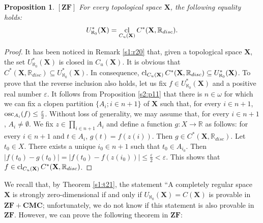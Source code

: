 \documentclass[12pt,twoside,leqno]{article}
\theoremstyle{plain}
\newtheorem{proposition}[theorem]{Proposition}
\theoremstyle{definition}
\theoremstyle{remark}
\DeclareMathOperator{\cl}{{\rm cl}}
\DeclareMathOperator{\osc}{{\rm osc}}
\begin{document}
\begin{proposition}
	\label{s2:p12}
	$[\mathbf{ZF}]$  For every topological space $\mathbf{X}$, the following equality holds:
	$$U_{\aleph_0}^{\ast}(\mathbf{X})=\cl_{C_u(\mathbf{X})}C^{\ast}(\mathbf{X}, \mathbb{R}_{disc}).$$
\end{proposition}
\begin{proof}
	It has been noticed in Remark \ref{s1:r20} that, given a topological space $\mathbf{X}$, the set $U_{\aleph_0}^{\ast}(\mathbf{X})$ is closed in $C_u(\mathbf{X})$. It is obvious that $C^{\ast}(\mathbf{X}, \mathbb{R}_{disc})\subseteq U_{\aleph_0}^{\ast}(\mathbf{X})$. In consequence, $\cl_{C_u(\mathbf{X})}C^{\ast}(\mathbf{X}, \mathbb{R}_{disc})\subseteq U_{\aleph_0}^{\ast}(\mathbf{X})$. To prove that the reverse inclusion also holds, let us fix $f\in U_{\aleph_0}^{\ast}(\mathbf{X})$ and a positive real number $\varepsilon$. It follows from Proposition \ref{s2:p11} that there is  $n\in\omega$ for which we can fix a clopen partition $\{A_i; i\in n+1\}$ of $\mathbf{X}$ such that, for every $i\in n+1$, $\osc_{A_i}(f)\leq\frac{\varepsilon}{2}$. Without loss of generality, we may assume that, for every $i\in n+1$, $A_i\neq\emptyset$. We fix $z\in\prod\limits_{i\in n+1}A_i$ and define a function $g:X\to\mathbb{R}$ as follows: for every $i\in n+1$ and $t\in A_i$, $g(t)=f(z(i))$. Then $g\in C^{\ast}(\mathbf{X}, \mathbb{R}_{disc})$. Let $t_0\in X$. There exists a unique $i_0\in n+1$ such that $t_0\in A_{i_0}$. Then $|f(t_0)-g(t_0)|=|f(t_0)-f(z(i_0))|\leq\frac{\varepsilon}{2}<\varepsilon$. This shows that $f\in\cl_{C_u(\mathbf{X})}C^{\ast}(\mathbf{X}, \mathbb{R}_{disc})$.%
\end{proof}

We recall that, by Theorem \ref{s1:t21}, the statement ``A completely regular space $\mathbf{X}$ is strongly zero-dimensional if and only if $U_{\aleph_0}(\mathbf{X})=C(\mathbf{X})$ is provable in $\mathbf{ZF+CMC}$; unfortunately, we do not know if this statement is also provable in $\mathbf{ZF}$. However, we can prove the following theorem in $\mathbf{ZF}$:
\end{document}
